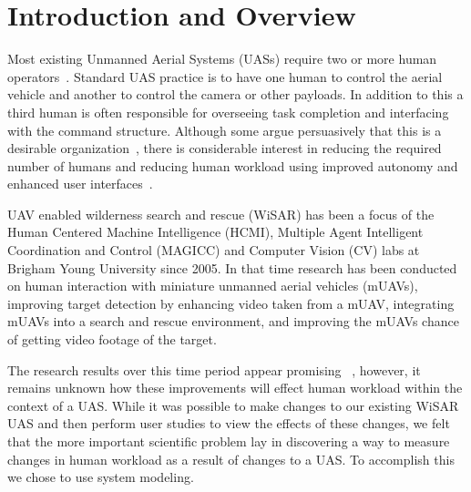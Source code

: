 \chapter{Introduction and Overview}

Most existing Unmanned Aerial Systems (UASs) require two or more human operators~\cite{GoodrichMorse2008,MurphyStoverPrattGriffin2006}. Standard UAS practice is to have one human to control the aerial vehicle and another to control the camera or other payloads. In addition to this a third human is often responsible for overseeing task completion and interfacing with the command structure. Although some argue persuasively that this is a desirable organization~\cite{MurphyBurke2010}, there is considerable interest in reducing the required number of humans and reducing human workload using improved autonomy and enhanced user interfaces~\cite{Cummings2007,MitchellCummings2005,goodrich2010fanout}.

UAV enabled wilderness search and rescue (WiSAR) has been a focus of the Human
Centered Machine Intelligence (HCMI), Multiple Agent Intelligent Coordination and Control (MAGICC) and Computer Vision (CV) labs at Brigham Young University since 2005.  In that time research has been conducted on human interaction with miniature unmanned aerial vehicles (mUAVs), improving target detection by enhancing video taken from a mUAV, integrating mUAVs into a search and rescue environment, and improving the mUAVs chance of getting video footage of the target.   

The research results over this time period appear promising ~\cite{a bunch of work}, however, it remains unknown how these improvements will effect human workload within the context of a UAS.  While it was possible to make changes to our existing WiSAR UAS and then perform user studies to view the effects of these changes, we felt that the more important scientific problem lay in discovering a way to measure changes in human workload as a result of changes to a UAS.  To accomplish this we chose to use system modeling. 

\begin{comment}
Lacking a fully operational UAS to experiment with, the question became how can we measure the human workload effects of introducing changes into a UAS without a working UAS?  And can we use these results acorssAlso, we desired a solution that was not limited to a single UAS but a solution that could be applied to any UAS.  The solution we came up with was

Lacking the resources to create a fully operational UAS, the question became how can we measure the effects of introducing new research into a UAS?  In response to this question we chose to use system modeling. 

their own context it is unknown how effective they are within the context of a real UAS.  prototypes of almost all the functionality existed, there was no way of knowing that the system as a whole would meet the requirements.  Instead of blindly pressing forward with the software development we decided that the more important scientific problem was to figure out how to model and validate the system design before implementation.
\end{comment}


